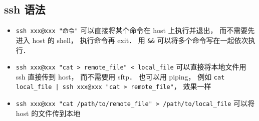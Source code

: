 \subsection{ssh 语法}
\begin{itemize}
\item \verb`ssh xxx@xxx "命令"` 可以直接将某个命令在 host 上执行并退出， 而不需要先进入 host 的 shell， 执行命令再 exit． 用 \verb`&&` 可以将多个命令写在一起依次执行．
\item \verb`ssh xxx@xxx "cat > remote_file" < local_file` 可以直接将本地文件用 ssh 直接传到 host， 而不需要用 sftp． 也可以用 piping， 例如 \verb`cat local_file | ssh xxx@xxx "cat > remote_file"`， 效果一样
\item \verb`ssh xxx@xxx "cat /path/to/remote_file" > /path/to/local_file` 可以将 host 的文件传到本地
\end{itemize}

